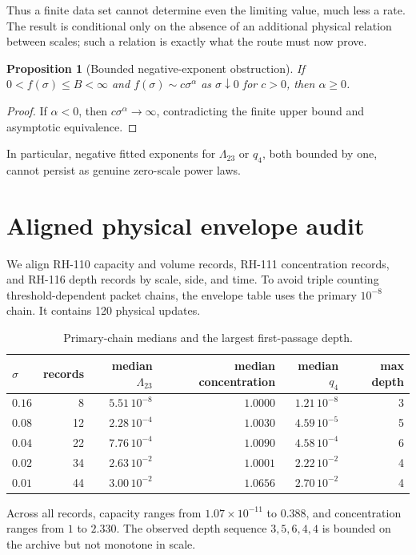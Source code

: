 \documentclass[12pt]{article}
\newtheorem{proposition}[theorem]{Proposition}
\begin{document}
Thus a finite data set cannot determine even the limiting value, much less a
rate.  The result is conditional only on the absence of an additional
physical relation between scales; such a relation is exactly what the route
must now prove.

\begin{proposition}[Bounded negative-exponent obstruction]\label{prop:power}
If $0<f(\sigma)\leq B<\infty$ and
$f(\sigma)\sim c\sigma^\alpha$ as $\sigma\downarrow0$ for $c>0$, then
$\alpha\geq0$.
\end{proposition}
\begin{proof}
If $\alpha<0$, then $c\sigma^\alpha\to\infty$, contradicting the finite
upper bound and asymptotic equivalence.
\end{proof}

In particular, negative fitted exponents for $\Lambda_{23}$ or $q_4$, both
bounded by one, cannot persist as genuine zero-scale power laws.

\section{Aligned physical envelope audit}
We align RH-110 capacity and volume records, RH-111 concentration records,
and RH-116 depth records by scale, side, and time.  To avoid triple counting
threshold-dependent packet chains, the envelope table uses the primary
$10^{-8}$ chain.  It contains 120 physical updates.

\begin{table}[h]
\centering
\begin{tabular}{lrrrrr}
\toprule
$\sigma$ & records & median $\Lambda_{23}$ & median concentration & median $q_4$ & max depth\\
\midrule
$0.16$ & 8  & $5.51\,10^{-8}$ & $1.0000$ & $1.21\,10^{-8}$ & 3\\
$0.08$ & 12 & $2.28\,10^{-4}$ & $1.0030$ & $4.59\,10^{-5}$ & 5\\
$0.04$ & 22 & $7.76\,10^{-4}$ & $1.0090$ & $4.58\,10^{-4}$ & 6\\
$0.02$ & 34 & $2.63\,10^{-2}$ & $1.0001$ & $2.22\,10^{-2}$ & 4\\
$0.01$ & 44 & $3.00\,10^{-2}$ & $1.0656$ & $2.70\,10^{-2}$ & 4\\
\bottomrule
\end{tabular}
\caption{Primary-chain medians and the largest first-passage depth.}
\end{table}

Across all records, capacity ranges from $1.07\times10^{-11}$ to $0.388$,
and concentration ranges from $1$ to $2.330$.  The observed depth sequence
$3,5,6,4,4$ is bounded on the archive but not monotone in scale.
\end{document}
